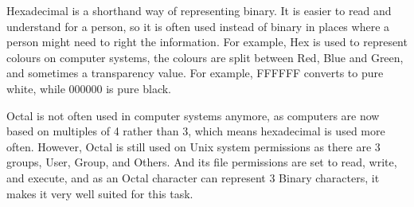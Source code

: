 \documentclass[a4paper,12pt]{article}
\begin{document}
  Hexadecimal is a shorthand way of representing binary. It is easier to read and understand for a person, so it is often used instead of binary in places where a person might need to right the information. For example, Hex is used to represent colours on computer systems, the colours are split between Red, Blue and Green, and sometimes a transparency value. For example, FFFFFF converts to pure white, while 000000 is pure black.

  Octal is not often used in computer systems anymore, as computers are now based on multiples of 4 rather than 3, which means hexadecimal is used more often. However, Octal is still used on Unix system permissions as there are 3 groups, User, Group, and Others. And its file permissions are set to read, write, and execute, and as an Octal character can represent 3 Binary characters, it makes it very well suited for this task.
\end{document}
